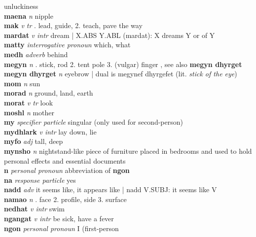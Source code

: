 unluckiness\\\textbf{maena}   \emph{n} \textperiodcentered nipple\\\textbf{mak}   \emph{v tr} . lead, guide, 2. teach, pave the way \\\textbf{mardat}   \emph{v intr} \textperiodcentered dream | X.ABS Y.ABL (mardat): X dreams Y or of Y\\\textbf{matty}   \emph{interrogative pronoun} \textperiodcentered which, what\\\textbf{medh}   \emph{adverb} \textperiodcentered behind\\\textbf{megyn}   \emph{n} . stick, rod 2. tent pole 3. (vulgar) finger , see also \textbf{megyn dhyrget}\\\textbf{megyn dhyrget}   \emph{n} \textperiodcentered eyebrow | dual is megynef dhyrgefet (lit. \emph{stick of the eye})\\\textbf{mom}   \emph{n} \textperiodcentered sun\\\textbf{morad}   \emph{n} \textperiodcentered ground, land, earth\\\textbf{morat}   \emph{v tr} \textperiodcentered look\\\textbf{moshl}   \emph{n} \textperiodcentered mother\\\textbf{my}   \emph{specifier particle} \textperiodcentered singular (only used for second-person)\\\textbf{mydhlark}   \emph{v intr} \textperiodcentered lay down, lie\\\textbf{myfo}   \emph{adj} \textperiodcentered tall, deep\\\textbf{mynsho}   \emph{n} \textperiodcentered nightstand-like piece of furniture placed in bedrooms and used to hold personal effects and essential documents\\\textbf{n}   \emph{personal pronoun} \textperiodcentered abbreviation of \textbf{ngon}\\\textbf{na}   \emph{response particle} \textperiodcentered yes\\\textbf{nadd}   \emph{adv} \textperiodcentered it seems like, it appears like | nadd V.SUBJ: it seems like V\\\textbf{namao}   \emph{n} . face 2. profile, side 3. surface \\\textbf{nedhat}   \emph{v intr} \textperiodcentered swim\\\textbf{ngangat}   \emph{v intr} \textperiodcentered be sick, have a fever\\\textbf{ngon}   \emph{personal pronoun} \textperiodcentered I (first-person 